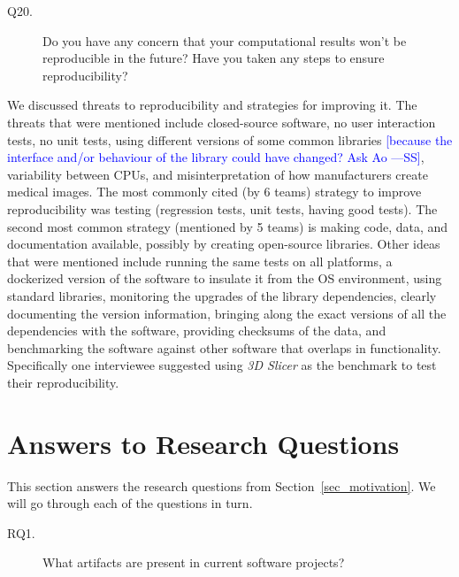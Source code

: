 \documentclass[final, 3p, times, authoryear]{elsarticle}
\newcommand{\authornote}[3]{\textcolor{#1}{[#3 ---#2]}}
\newcommand{\authornote}[3]{}
\newcommand{\wss}[1]{\authornote{blue}{SS}{#1}} %
\begin{document}
\begin{description}
\item[Q20.] Do you have any concern that your computational results won’t be
reproducible in the future? Have you taken any steps to ensure reproducibility?
\end{description}

We discussed threats to reproducibility and strategies for improving it.  The
threats that were mentioned include closed-source software, no user interaction
tests, no unit tests, using different versions of some common libraries
\wss{because the interface and/or behaviour of the library could have changed?
Ask Ao}, variability between CPUs, and misinterpretation of how manufacturers
create medical images. The most commonly cited (by 6 teams) strategy to improve
reproducibility was testing (regression tests, unit tests, having good tests).
The second most common strategy (mentioned by 5 teams) is making code, data, and
documentation available, possibly by creating open-source libraries.  Other
ideas that were mentioned include running the same tests on all platforms, a
dockerized version of the software to insulate it from the OS environment, using
standard libraries, monitoring the upgrades of the library dependencies, clearly
documenting the version information, bringing along the exact versions of all
the dependencies with the software, providing checksums of the data, and
benchmarking the software against other software that overlaps in functionality.
Specifically one interviewee suggested using \textit{3D Slicer} as the benchmark
to test their reproducibility.

\section{Answers to Research Questions} \label{ch_answers}

This section answers the research questions from
Section~\ref{sec_motivation}.  We will go through each of the questions
in turn.

\begin{description}
\item[RQ1.] What artifacts are present in current software projects?
\end{description}
\end{document}

